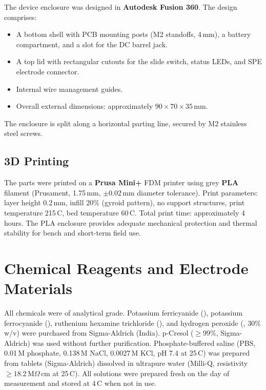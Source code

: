 The device enclosure was designed in \textbf{Autodesk Fusion 360}. The design comprises:
\begin{itemize}
    \item A bottom shell with PCB mounting posts (M2 standoffs, 4\,mm), a battery compartment, and a slot for the DC barrel jack.
    \item A top lid with rectangular cutouts for the slide switch, status LEDs, and SPE electrode connector.
    \item Internal wire management guides.
    \item Overall external dimensions: approximately $90 \times 70 \times 35$\,mm.
\end{itemize}
The enclosure is split along a horizontal parting line, secured by M2 stainless steel screws.

\subsection{3D Printing}

The parts were printed on a \textbf{Prusa Mini+} FDM printer using grey \textbf{PLA} filament (Prusament, 1.75\,mm, $\pm$0.02\,mm diameter tolerance). Print parameters: layer height 0.2\,mm, infill 20\% (gyroid pattern), no support structures, print temperature 215\,\textdegree{}C, bed temperature 60\,\textdegree{}C. Total print time: approximately 4\,hours. The PLA enclosure provides adequate mechanical protection and thermal stability for bench and short-term field use.


\section{Chemical Reagents and Electrode Materials}
\label{sec:chemicals}

All chemicals were of analytical grade. Potassium ferricyanide (), potassium ferrocyanide (), ruthenium hexamine trichloride (), and hydrogen peroxide (, 30\% w/v) were purchased from Sigma-Aldrich (India). p-Cresol ($\geq$99\%, Sigma-Aldrich) was used without further purification. Phosphate-buffered saline (PBS, 0.01\,M phosphate, 0.138\,M NaCl, 0.0027\,M KCl, pH 7.4 at 25\,\textdegree{}C) was prepared from tablets (Sigma-Aldrich) dissolved in ultrapure water (Milli-Q, resistivity $\geq 18.2$\,M$\Omega$\,cm at 25\,\textdegree{}C). All solutions were prepared fresh on the day of measurement and stored at 4\,\textdegree{}C when not in use.

